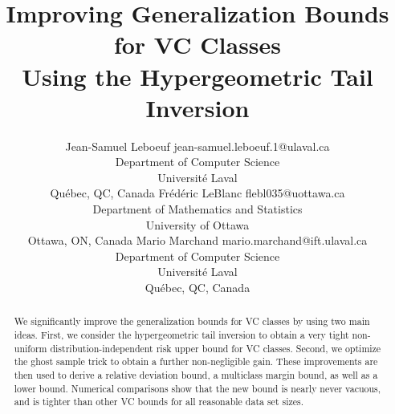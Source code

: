 \documentclass[twoside,11pt]{article}
\begin{document}
\title{Improving Generalization Bounds for VC Classes\\ Using the Hypergeometric Tail Inversion}

\author{\name Jean-Samuel Leboeuf \email jean-samuel.leboeuf.1@ulaval.ca \\
        \addr Department of Computer Science\\
        Universit\'e Laval\\
        Qu\'ebec, QC, Canada
        \AND
        \name Fr\'ed\'eric LeBlanc \email flebl035@uottawa.ca\\
        \addr Department of Mathematics and Statistics\\
        University of Ottawa\\
        Ottawa, ON, Canada
        \AND
        \name Mario Marchand \email mario.marchand@ift.ulaval.ca \\
        \addr Department of Computer Science\\
        Universit\'e Laval\\
        Qu\'ebec, QC, Canada
        }


\maketitle

\begin{abstract}%
We significantly improve the generalization bounds for VC classes by using two main ideas.
First, we consider the hypergeometric tail inversion to obtain a very tight non-uniform distribution-independent risk upper bound for VC classes.
Second, we optimize the ghost sample trick to obtain a further non-negligible gain.
These improvements are then used to derive a relative deviation bound, a multiclass margin bound, as well as a lower bound.
Numerical comparisons show that the new bound is nearly never vacuous, and is tighter than other VC bounds for all reasonable data set sizes.
\end{abstract}
\end{document}
